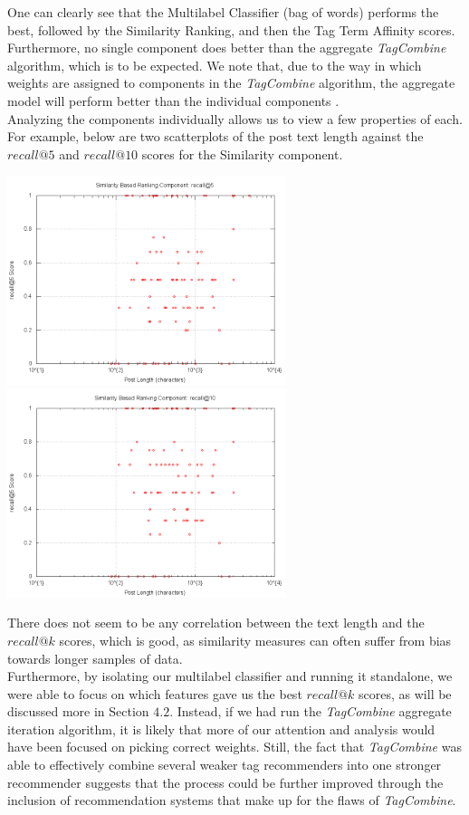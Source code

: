 \documentclass[10pt, final]{article}
\newcommand{\br}[1][.75]{\ \\[#1\baselineskip]}
\begin{document}
One can clearly see that the Multilabel Classifier (bag of words) performs the best, followed by the Similarity Ranking, and then the Tag Term Affinity scores. Furthermore, no single component does better than the aggregate \textit{TagCombine} algorithm, which is to be expected. We note that, due to the way in which weights are assigned to components in the \textit{TagCombine} algorithm, the aggregate model will perform better than the individual components \cite{1}.\br
Analyzing the components individually allows us to view a few properties of each. For example, below are two scatterplots of the post text length against the $recall@5$ and $recall@10$ scores for the Similarity component.

\begin{center}
\includegraphics[width=3.2in]{sim-50000-recall5.png}
\includegraphics[width=3.2in]{sim-50000-recall10.png}
\end{center}

There does not seem to be any correlation between the text length and the $recall@k$ scores, which is good, as similarity measures can often suffer from bias towards longer samples of data.\br
Furthermore, by isolating our multilabel classifier and running it standalone, we were able to focus on which features gave us the best $recall@k$ scores, as will be discussed more in Section $4.2$. Instead, if we had run the \textit{TagCombine} aggregate iteration algorithm, it is likely that more of our attention and analysis would have been focused on picking correct weights. Still, the fact that \textit{TagCombine} was able to effectively combine several weaker tag recommenders into one stronger recommender suggests that the process could be further improved through the inclusion of recommendation systems that make up for the flaws of \textit{TagCombine}.
\end{document}

